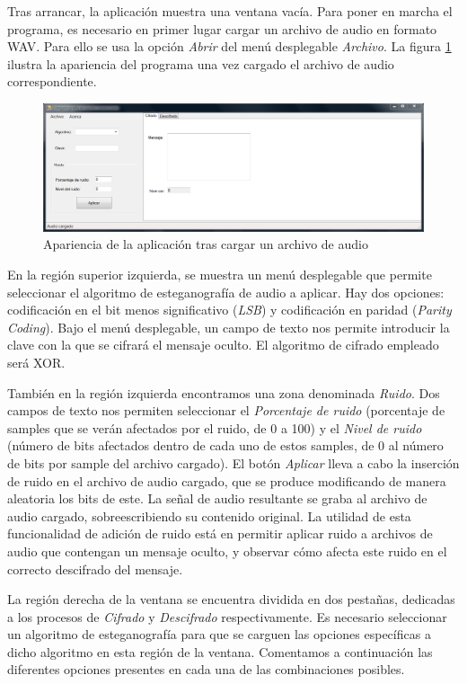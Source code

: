 \documentclass[12pt]{article}
\begin{document}
Tras arrancar, la aplicación muestra una ventana vacía. Para poner en marcha el programa, es necesario en primer lugar cargar un archivo de audio en formato WAV. Para ello se usa la opción \emph{Abrir} del menú desplegable \emph{Archivo}. La figura \ref{ss1} ilustra la apariencia del programa una vez cargado el archivo de audio correspondiente.

\begin{figure}[h]
  \centering
    \includegraphics[width=\textwidth]{img/ss1}
  \caption{Apariencia de la aplicación tras cargar un archivo de audio}
  \label{ss1}
\end{figure}

En la región superior izquierda, se muestra un menú desplegable que permite seleccionar el algoritmo de esteganografía de audio a aplicar. Hay dos opciones: codificación en el bit menos significativo (\emph{LSB}) y codificación en paridad (\emph{Parity Coding}). Bajo el menú desplegable, un campo de texto nos permite introducir la clave con la que se cifrará el mensaje oculto. El algoritmo de cifrado empleado será XOR.

También en la región izquierda encontramos una zona denominada \emph{Ruido}. Dos campos de texto nos permiten seleccionar el \emph{Porcentaje de ruido} (porcentaje de samples que se verán afectados por el ruido, de 0 a 100) y el \emph{Nivel de ruido} (número de bits afectados dentro de cada uno de estos samples, de 0 al número de bits por sample del archivo cargado). El botón \emph{Aplicar} lleva a cabo la inserción de ruido en el archivo de audio cargado, que se produce modificando de manera aleatoria los bits de este. La señal de audio resultante se graba al archivo de audio cargado, sobreescribiendo su contenido original. La utilidad de esta funcionalidad de adición de ruido está en permitir aplicar ruido a archivos de audio que contengan un mensaje oculto, y observar cómo afecta este ruido en el correcto descifrado del mensaje.

La región derecha de la ventana se encuentra dividida en dos pestañas, dedicadas a los procesos de \emph{Cifrado} y \emph{Descifrado} respectivamente. Es necesario seleccionar un algoritmo de esteganografía para que se carguen las opciones específicas a dicho algoritmo en esta región de la ventana. Comentamos a continuación las diferentes opciones presentes en cada una de las combinaciones posibles.
\end{document}

